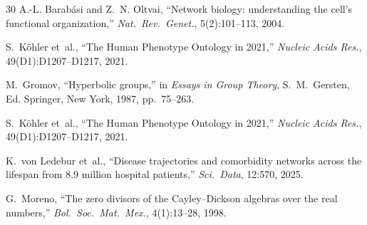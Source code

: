 \documentclass[11pt,a4paper]{article}
\begin{document}
\begin{thebibliography}{30}
A.-L. Barab\'asi and Z.~N. Oltvai,
``Network biology: understanding the cell's functional organization,''
\emph{Nat.~Rev.~Genet.}, 5(2):101--113, 2004.

S.~K{\"o}hler et~al.,
``The Human Phenotype Ontology in 2021,''
\emph{Nucleic Acids Res.}, 49(D1):D1207--D1217, 2021.

M.~Gromov,
``Hyperbolic groups,''
in \emph{Essays in Group Theory}, S.~M.~Gersten, Ed. Springer, New York, 1987, pp.~75--263.

S.~K\"ohler et~al.,
``The Human Phenotype Ontology in 2021,''
\emph{Nucleic Acids Res.}, 49(D1):D1207--D1217, 2021.

K.~von Ledebur et~al.,
``Disease trajectories and comorbidity networks across the lifespan from 8.9 million hospital patients,''
\emph{Sci.~Data}, 12:570, 2025.

G.~Moreno,
``The zero divisors of the Cayley--Dickson algebras over the real numbers,''
\emph{Bol.~Soc.~Mat.~Mex.}, 4(1):13--28, 1998.

\end{thebibliography}
\end{document}
